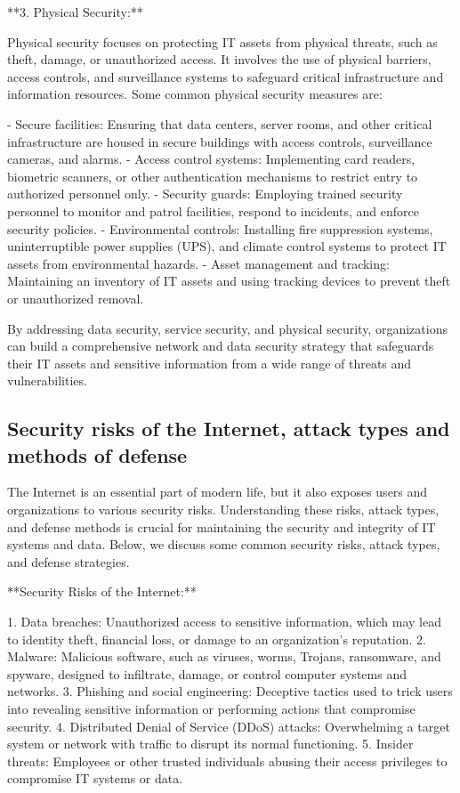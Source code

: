 \documentclass{article}
\begin{document}
**3. Physical Security:**

Physical security focuses on protecting IT assets from physical threats, such as theft, damage, or unauthorized access. It involves the use of physical barriers, access controls, and surveillance systems to safeguard critical infrastructure and information resources. Some common physical security measures are:

- Secure facilities: Ensuring that data centers, server rooms, and other critical infrastructure are housed in secure buildings with access controls, surveillance cameras, and alarms.
- Access control systems: Implementing card readers, biometric scanners, or other authentication mechanisms to restrict entry to authorized personnel only.
- Security guards: Employing trained security personnel to monitor and patrol facilities, respond to incidents, and enforce security policies.
- Environmental controls: Installing fire suppression systems, uninterruptible power supplies (UPS), and climate control systems to protect IT assets from environmental hazards.
- Asset management and tracking: Maintaining an inventory of IT assets and using tracking devices to prevent theft or unauthorized removal.

By addressing data security, service security, and physical security, organizations can build a comprehensive network and data security strategy that safeguards their IT assets and sensitive information from a wide range of threats and vulnerabilities.


\subsection{Security risks of the Internet, attack types and methods of defense}

The Internet is an essential part of modern life, but it also exposes users and organizations to various security risks. Understanding these risks, attack types, and defense methods is crucial for maintaining the security and integrity of IT systems and data. Below, we discuss some common security risks, attack types, and defense strategies.

**Security Risks of the Internet:**

1. Data breaches: Unauthorized access to sensitive information, which may lead to identity theft, financial loss, or damage to an organization's reputation.
2. Malware: Malicious software, such as viruses, worms, Trojans, ransomware, and spyware, designed to infiltrate, damage, or control computer systems and networks.
3. Phishing and social engineering: Deceptive tactics used to trick users into revealing sensitive information or performing actions that compromise security.
4. Distributed Denial of Service (DDoS) attacks: Overwhelming a target system or network with traffic to disrupt its normal functioning.
5. Insider threats: Employees or other trusted individuals abusing their access privileges to compromise IT systems or data.
\end{document}
